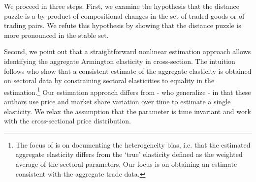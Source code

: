 \documentclass[12pt,twoside,a4paper,notitlepage]{article}
\begin{document}
We proceed in three steps.
First, we examine the hypothesis that the distance puzzle is a by-product of compositional changes in the set of traded goods or of trading pairs.
We refute this hypothesis by showing that the distance puzzle is more pronounced in the stable set.

Second, we point out that a straightforward nonlinear estimation approach allows identifying the aggregate Armington elasticity in cross-section. The intuition follows \cite{Imbs2015} who show that a consistent estimate of the aggregate elasticity is obtained on sectoral data by constraining sectoral elasticities to equality in the estimation.\footnote{The focus of \cite{Imbs2015} is on documenting the heterogeneity bias, i.e. that the estimated aggregate elasticity differs from the `true' elasticity defined as the weighted average of the sectoral parameters. 
Our focus is on obtaining an estimate consistent with the aggregate trade data.} Our estimation approach differs from \cite{Imbs2015} - who generalize \cite{Feenstra1994} - in that these authors use price and market share variation over time to estimate a single elasticity. We relax the assumption that the parameter is time invariant and work with the cross-sectional price distribution. 
\end{document}
